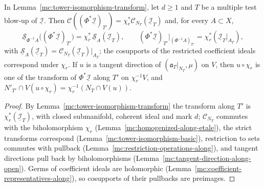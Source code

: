 \begin{lemma}
\label{mc:tower-isomorphism-coefficient}
\leanok
In Lemma~\ref{mc:tower-isomorphism-transform}, let \(d\ge1\) and \(T\) be a multiple test blow-up of \(\underline{\mathcal I}\). Then
\(\mathcal C((\Phi^*\underline{\mathcal I})_{T'})=\chi_r^*\mathcal C_{N_T}(\underline{\mathcal I}_T)\) and, for every \(A\subset X\),
\[\underline{\mathcal S}_{\Phi^{-1}A}\bigl((\Phi^*\underline{\mathcal I})_{T'}\bigr)=\chi_r^*\,\underline{\mathcal S}_A(\underline{\mathcal I}_T),\qquad
(\Phi^*\underline{\mathcal I})_{T'}|_{(\Phi^{-1}A)_{T'}}=\chi_r^*(\underline{\mathcal I}_T|_{A_T}),\]
with \(\underline{\mathcal S}_A(\underline{\mathcal I}_T)=\mathcal C_{N_T}(\underline{\mathcal I}_T)|_{A_T}\); the cosupports of the restricted coefficient ideals correspond under
\(\chi_r\). If \(u\) is a tangent direction of \((\mathfrak a_T|_{N_T},\mu)\) on \(V\), then \(u\circ\chi_r\) is one of the transform of \(\Phi^*\underline{\mathcal I}\) along \(T'\) on
\(\chi_r^{-1}V\), and \(N'_{T'}\cap V(u\circ\chi_r)=\chi_r^{-1}(N_T\cap V(u))\).
\end{lemma}
\begin{proof}
\leanok
By Lemma~\ref{mc:tower-isomorphism-transform} the transform along \(T'\) is \(\chi_r^*(\underline{\mathcal I}_T)\), with closed submanifold, coherent ideal and mark \(d\);
\(\mathcal C_{N_T}\) commutes with the biholomorphism \(\chi_r\) (Lemma~\ref{mc:homogenized-along-etale}), the strict transforms correspond (Lemma~\ref{mc:tower-isomorphism-basic}),
restriction to sets commutes with pullback (Lemma~\ref{mc:restriction-operations-along}), and tangent directions pull back by biholomorphisms
(Lemma~\ref{mc:tangent-direction-along-open}). Germs of coefficient ideals are holomorphic (Lemma~\ref{mc:coefficient-representatives-along}), so cosupports of their
pullbacks are preimages.
\end{proof}

